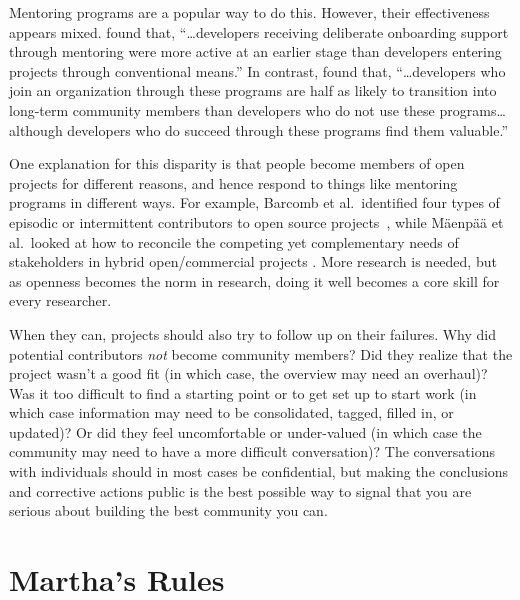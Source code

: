 \documentclass[10pt,letterpaper]{article}
\begin{document}
Mentoring programs are a popular way to do this.
However,
their effectiveness appears mixed.
\cite{fagerholm2014} found that,
``{\ldots}developers receiving deliberate onboarding support through mentoring
were more active at an earlier stage than developers entering projects through conventional means.''
In contrast,
\cite{labuschagne2015} found that,
``{\ldots}developers who join an organization through these programs
are half as likely to transition into long-term community members
than developers who do not use these programs{\ldots}
although developers who do succeed through these programs find them valuable.''

One explanation for this disparity is that people become members of open projects for different reasons,
and hence respond to things like mentoring programs in different ways.
For example,
Barcomb et al.\ identified four types of episodic or intermittent contributors to open source projects~\cite{barcomb2019},
while M\"{a}enp\"{a}\"{a} et al.\ looked at how to reconcile
the competing yet complementary needs of stakeholders in hybrid open/commercial projects \cite{maenpaa2018}.
More research is needed,
but as openness becomes the norm in research,
doing it well becomes a core skill for every researcher.

When they can,
projects should also try to follow up on their failures.
Why did potential contributors \emph{not} become community members?
Did they realize that the project wasn't a good fit
(in which case, the overview may need an overhaul)?
Was it too difficult to find a starting point or to get set up to start work
(in which case information may need to be consolidated, tagged, filled in, or updated)?
Or did they feel uncomfortable or under-valued
(in which case the community may need to have a more difficult conversation)?
The conversations with individuals should in most cases be confidential,
but making the conclusions and corrective actions public
is the best possible way to signal that you are serious about building the best community you can.

\section*{Martha's Rules}
\end{document}
